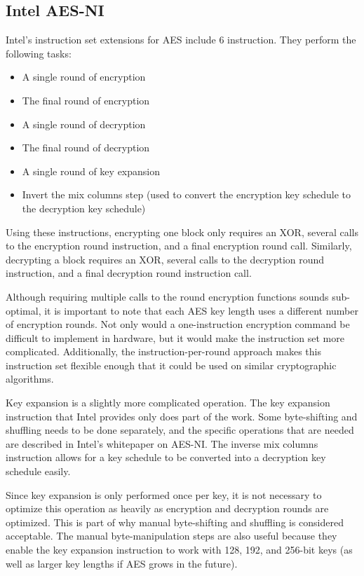 \documentclass[a4paper,10pt,conference]{IEEEtran}
\begin{document}
\subsection{Intel AES-NI}

Intel's instruction set extensions for AES include 6 instruction\cite{intel}. They perform the following tasks:

\begin{itemize}
 \item A single round of encryption
 \item The final round of encryption
 \item A single round of decryption
 \item The final round of decryption
 \item A single round of key expansion
 \item Invert the mix columns step (used to convert the encryption key schedule to the decryption key schedule)
\end{itemize}

Using these instructions, encrypting one block only requires an XOR, several calls to the encryption round instruction, and a final encryption round call.  Similarly, decrypting a block requires an XOR, several calls to the decryption round instruction, and a final decryption round instruction call.

Although requiring multiple calls to the round encryption functions sounds sub-optimal, it is important to note that each AES key length uses a different number of encryption rounds.  Not only would a one-instruction encryption command be difficult to implement in hardware, but it would make the instruction set more complicated.  Additionally, the instruction-per-round approach makes this instruction set flexible enough that it could be used on similar cryptographic algorithms.

Key expansion is a slightly more complicated operation.  The key expansion instruction that Intel provides only does part of the work.  Some byte-shifting and shuffling needs to be done separately, and the specific operations that are needed are described in Intel's whitepaper on AES-NI.  The inverse mix columns instruction allows for a key schedule to be converted into a decryption key schedule easily.

Since key expansion is only performed once per key, it is not necessary to optimize this operation as heavily as encryption and decryption rounds are optimized.  This is part of why manual byte-shifting and shuffling is considered acceptable.  The manual byte-manipulation steps are also useful because they enable the key expansion instruction to work with 128, 192, and 256-bit keys (as well as larger key lengths if AES grows in the future).
\end{document}
